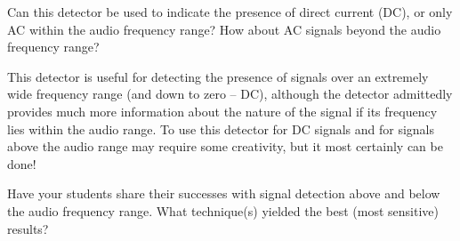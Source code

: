 

Can this detector be used to indicate the presence of direct current (DC), or only AC within the audio frequency range?  How about AC signals beyond the audio frequency range?







This detector is useful for detecting the presence of signals over an extremely wide frequency range (and down to zero -- DC), although the detector admittedly provides much more information about the nature of the signal if its frequency lies within the audio range.  To use this detector for DC signals and for signals above the audio range may require some creativity, but it most certainly can be done!







Have your students share their successes with signal detection above and below the audio frequency range.  What technique(s) yielded the best (most sensitive) results?



